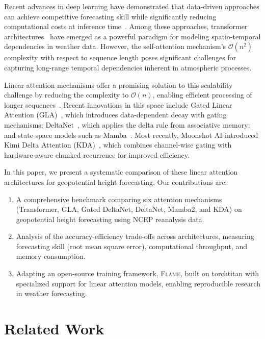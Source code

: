 \documentclass[runningheads]{llncs}
\newcommand{\method}{\textsc{Flame}}
\begin{document}
Recent advances in deep learning have demonstrated that data-driven approaches can achieve competitive forecasting skill while significantly reducing computational costs at inference time~\cite{pathak2022fourcastnet,bi2023accurate,lam2023learning}. Among these approaches, transformer architectures~\cite{vaswani2017attention} have emerged as a powerful paradigm for modeling spatio-temporal dependencies in weather data. However, the self-attention mechanism's $\mathcal{O}(n^2)$ complexity with respect to sequence length poses significant challenges for capturing long-range temporal dependencies inherent in atmospheric processes.

Linear attention mechanisms offer a promising solution to this scalability challenge by reducing the complexity to $\mathcal{O}(n)$, enabling efficient processing of longer sequences~\cite{katharopoulos2020transformers}. Recent innovations in this space include Gated Linear Attention (GLA)~\cite{yang2024gated}, which introduces data-dependent decay with gating mechanisms; DeltaNet~\cite{schlag2021linear}, which applies the delta rule from associative memory; and state-space models such as Mamba~\cite{gu2024mamba,dao2024transformers}. Most recently, Moonshot AI introduced Kimi Delta Attention (KDA)~\cite{team2025kimi}, which combines channel-wise gating with hardware-aware chunked recurrence for improved efficiency.

In this paper, we present a systematic comparison of these linear attention architectures for geopotential height forecasting. Our contributions are:

\begin{enumerate}
    \item A comprehensive benchmark comparing six attention mechanisms (Transformer, GLA, Gated DeltaNet, DeltaNet, Mamba2, and KDA) on geopotential height forecasting using NCEP reanalysis data.
    \item Analysis of the accuracy-efficiency trade-offs across architectures, measuring forecasting skill (root mean square error), computational throughput, and memory consumption.
    \item Adapting an open-source training framework, \method{}, built on torchtitan with specialized support for linear attention models, enabling reproducible research in weather forecasting.
\end{enumerate}

\section{Related Work}
\label{sec:related}
\end{document}
